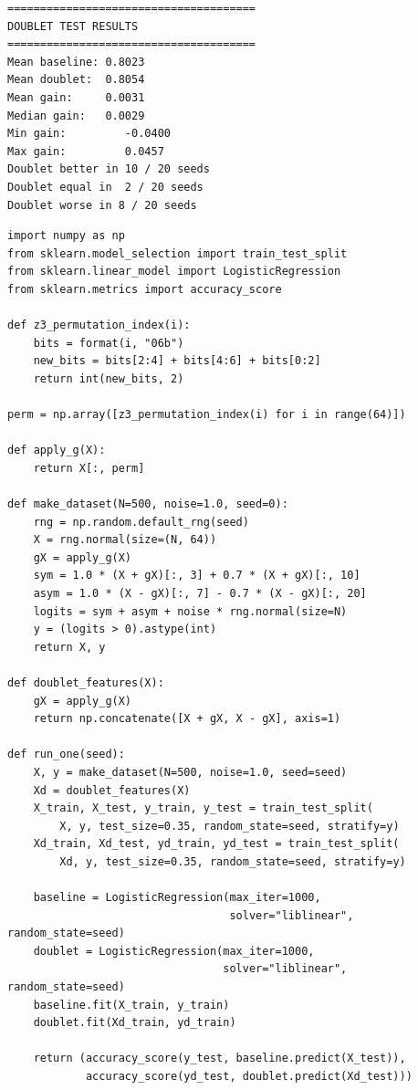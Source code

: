 \documentclass[11pt,a4paper]{report}
\begin{document}
\label{app:ch3-lst4}
\begin{lstlisting}[style=textstyle, caption=Result of SBOHN-2 experiment]
======================================
DOUBLET TEST RESULTS
======================================
Mean baseline: 0.8023
Mean doublet:  0.8054
Mean gain:     0.0031
Median gain:   0.0029
Min gain:         -0.0400
Max gain:         0.0457
Doublet better in 10 / 20 seeds
Doublet equal in  2 / 20 seeds
Doublet worse in 8 / 20 seeds
\end{lstlisting}

\label{app:ch3-lst5}
\begin{lstlisting}[caption=SBOHN Experiment 3: linear test]
import numpy as np
from sklearn.model_selection import train_test_split
from sklearn.linear_model import LogisticRegression
from sklearn.metrics import accuracy_score

def z3_permutation_index(i):
    bits = format(i, "06b")
    new_bits = bits[2:4] + bits[4:6] + bits[0:2]
    return int(new_bits, 2)

perm = np.array([z3_permutation_index(i) for i in range(64)])

def apply_g(X):
    return X[:, perm]

def make_dataset(N=500, noise=1.0, seed=0):
    rng = np.random.default_rng(seed)
    X = rng.normal(size=(N, 64))
    gX = apply_g(X)
    sym = 1.0 * (X + gX)[:, 3] + 0.7 * (X + gX)[:, 10]
    asym = 1.0 * (X - gX)[:, 7] - 0.7 * (X - gX)[:, 20]
    logits = sym + asym + noise * rng.normal(size=N)
    y = (logits > 0).astype(int)
    return X, y

def doublet_features(X):
    gX = apply_g(X)
    return np.concatenate([X + gX, X - gX], axis=1)

def run_one(seed):
    X, y = make_dataset(N=500, noise=1.0, seed=seed)
    Xd = doublet_features(X)
    X_train, X_test, y_train, y_test = train_test_split(
        X, y, test_size=0.35, random_state=seed, stratify=y)
    Xd_train, Xd_test, yd_train, yd_test = train_test_split(
        Xd, y, test_size=0.35, random_state=seed, stratify=y)

    baseline = LogisticRegression(max_iter=1000,
                                  solver="liblinear", random_state=seed)
    doublet = LogisticRegression(max_iter=1000,
                                 solver="liblinear", random_state=seed)
    baseline.fit(X_train, y_train)
    doublet.fit(Xd_train, yd_train)

    return (accuracy_score(y_test, baseline.predict(X_test)),
            accuracy_score(yd_test, doublet.predict(Xd_test)))


\end{lstlisting}
\end{document}

